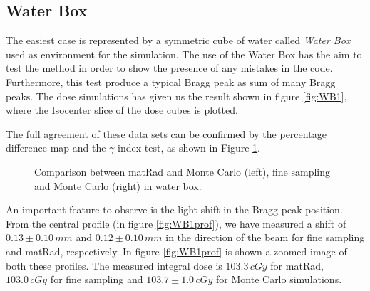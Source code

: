 \documentclass[12pt, a4paper, twoside]{book}
\begin{document}

\subsection{Water Box}
The easiest case is represented by a symmetric cube of water called \emph{Water Box} used as environment for the simulation. The use of the Water Box has the aim to test the method in order to show the presence of any mistakes in the code. Furthermore, this test produce a typical Bragg peak as sum of many Bragg peaks. 
The dose simulations has given us the result shown in figure \ref{fig:WB1}, where the Isocenter slice of the dose cubes is plotted.



The full agreement of these data sets can be confirmed by the percentage difference map and the $\gamma$-index test, as shown in Figure \ref{fig:WB1gam}.
\begin{figure}[!ht]
\centering
{} 
\caption{Comparison between matRad and Monte Carlo (left), fine sampling and Monte Carlo (right) in water box.}
\label{fig:WB1gam}
\end{figure}

An important feature to observe is the light shift in the Bragg peak position. From the central profile (in figure \ref{fig:WB1prof}), we have measured a shift of $0.13\pm0.10\,mm$ and $0.12\pm0.10\,mm$ in the direction of the beam for fine sampling and matRad, respectively. In figure \ref{fig:WB1prof} is shown a zoomed image of both these profiles.
The measured integral dose is $103.3\,cGy$ for matRad, $103.0\,cGy$ for fine sampling and $103.7\pm1.0\,cGy$ for Monte Carlo simulations.\\
\\
\end{document}
